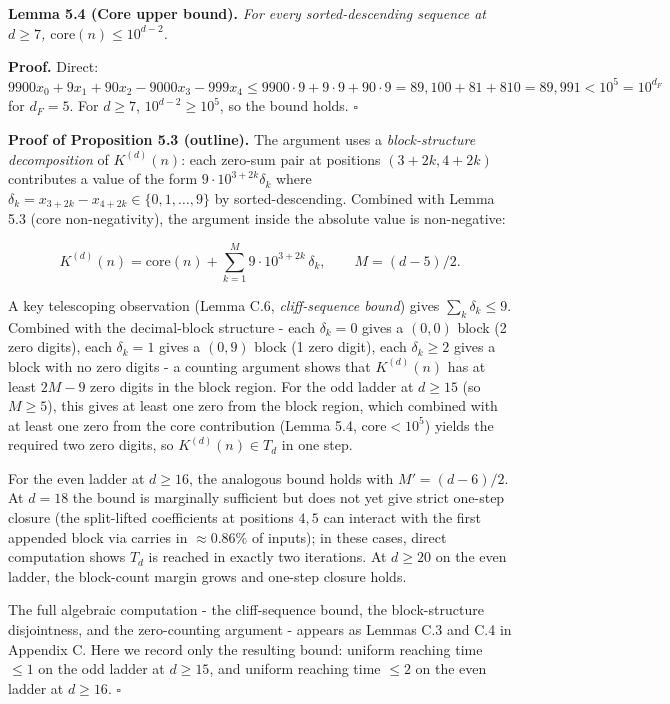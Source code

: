 \documentclass[11pt,letterpaper]{article}
\theoremstyle{paperstyle}
\theoremstyle{paperstyledef}
\theoremstyle{paperstylerem}
\begin{document}
\textbf{Lemma 5.4 (Core upper bound).} \emph{For every sorted-descending
sequence at \(d \geq 7\), \(\mathrm{core}(n) \leq 10^{d-2}\).}

\textbf{Proof.} Direct:
\(9900 x_0 + 9 x_1 + 90 x_2 - 9000 x_3 - 999 x_4 \leq 9900 \cdot 9 + 9 \cdot 9 + 90 \cdot 9 = 89{,}100 + 81 + 810 = 89{,}991 < 10^5 = 10^{d_{F}}\)
for \(d_F = 5\). For \(d \geq 7\), \(10^{d-2} \geq 10^5\), so the bound
holds. \(\square\)

\textbf{Proof of Proposition 5.3 (outline).} The argument uses a
\emph{block-structure decomposition} of \(K^{(d)}(n)\): each zero-sum
pair at positions \((3+2k, 4+2k)\) contributes a value of the form
\(9 \cdot 10^{3+2k} \delta_k\) where
\(\delta_k = x_{3+2k} - x_{4+2k} \in \{0, 1, \ldots, 9\}\) by
sorted-descending. Combined with Lemma 5.3 (core non-negativity), the
argument inside the absolute value is non-negative:

\[K^{(d)}(n) = \mathrm{core}(n) + \sum_{k=1}^{M} 9 \cdot 10^{3+2k} \, \delta_k, \qquad M = (d-5)/2.\]

A key telescoping observation (Lemma C.6, \emph{cliff-sequence bound})
gives \(\sum_k \delta_k \leq 9\). Combined with the decimal-block
structure - each \(\delta_k = 0\) gives a \((0,0)\) block (2 zero
digits), each \(\delta_k = 1\) gives a \((0,9)\) block (1 zero digit),
each \(\delta_k \geq 2\) gives a block with no zero digits - a
counting argument shows that \(K^{(d)}(n)\) has at least \(2M - 9\) zero
digits in the block region. For the odd ladder at \(d \geq 15\) (so
\(M \geq 5\)), this gives at least one zero from the block region, which
combined with at least one zero from the core contribution (Lemma 5.4,
\(\mathrm{core} < 10^5\)) yields the required two zero digits, so
\(K^{(d)}(n) \in T_d\) in one step.

For the even ladder at \(d \geq 16\), the analogous bound holds with
\(M' = (d-6)/2\). At \(d = 18\) the bound is marginally sufficient but
does not yet give strict one-step closure (the split-lifted coefficients
at positions \(4, 5\) can interact with the first appended block via
carries in \(\approx 0.86\%\) of inputs); in these cases, direct
computation shows \(T_d\) is reached in exactly two iterations. At
\(d \geq 20\) on the even ladder, the block-count margin grows and
one-step closure holds.

The full algebraic computation - the cliff-sequence bound, the
block-structure disjointness, and the zero-counting argument - appears
as Lemmas C.3 and C.4 in Appendix C. Here we record only the resulting
bound: uniform reaching time \(\leq 1\) on the odd ladder at
\(d \geq 15\), and uniform reaching time \(\leq 2\) on the even ladder
at \(d \geq 16\). \(\square\)
\end{document}
